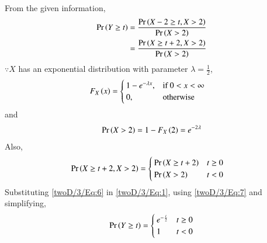From the given information, 
\begin{align}
\Pr\left(Y \geq t\right) &= \frac{\Pr\left(X-2 \geq t, X>2\right)}{\Pr\left(X>2\right)} 
\\
&= \frac{\Pr\left(X \geq t + 2, X>2\right)}{\Pr\left(X>2\right)} 
\label{twoD/3/Eq:1}
\end{align}
$\because  X$ has an exponential distribution with parameter $\lambda = \frac{1}{2}$, 
\begin{align}
	F_X\left(x\right) &= \begin{cases} \label{twoD/3/Eq:3}
				1 - e^{-\lambda x}, & \text{if $0 < x< \infty $}\\
				0, & \text{otherwise}
			 \end{cases} 
	\end{align}
	and
\begin{align}
	\Pr\left(X >2\right) = 1- F_X\left(2\right) = e^{-2\lambda}
	\label{twoD/3/Eq:7} 
	\end{align}
%	
Also, 
\begin{align}
	\label{twoD/3/Eq:6}
	\Pr\left(X \geq t+2,X>2\right) &= 
	\begin{cases}
	\Pr\left(X \geq t+2\right) & t \ge 0 \\
	\Pr\left(X > 2\right) & t < 0	
	\end{cases}
		\end{align}
Substituting \eqref{twoD/3/Eq:6} in \eqref{twoD/3/Eq:1},  using 	\eqref{twoD/3/Eq:7} and simplifying,  
\begin{align}
\Pr\left(Y \geq t\right) = 
\begin{cases}
	 e^{-\frac{t}{2}} & t \ge 0 \\
	1 & t < 0	
	\end{cases}
\end{align}
